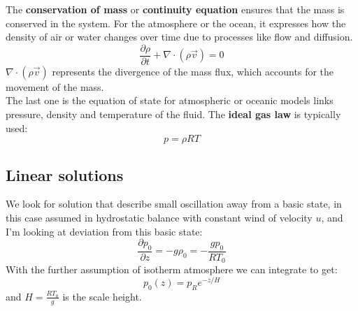 The \textbf{conservation of mass} or \textbf{continuity equation }ensures that the mass is conserved in the system. For the atmosphere or the ocean, it expresses how the density of air or water changes over time due to processes like flow and diffusion.
\begin{equation}
	\frac{\partial\rho}{\partial t}+\nabla\cdot(\rho\vec{v})=0
\end{equation}
$\nabla\cdot(\rho\vec{v})$ represents the divergence of the mass flux, which accounts for the movement of the mass.
\\
The last one is the equation of state for atmospheric or oceanic models links pressure, density and temperature of the fluid. The \textbf{ideal gas law} is typically used:
\begin{equation}
	p=\rho RT
\end{equation}

\subsection{Linear solutions}
We look for solution that describe small oscillation away from a basic state, in this case assumed in hydrostatic balance with constant wind of velocity $u$, and I'm looking at deviation from this basic state:
\begin{equation}
	\frac{\partial p_0}{\partial z}=-g\rho_0=-\frac{gp_0}{RT_0}
\end{equation}
With the further assumption of isotherm atmosphere we can integrate to get:
\begin{equation}
	p_0(z)=p_Re^{-z/H}
\end{equation}
and $H=\frac{RT_0}{g}$ is the scale height. \\


